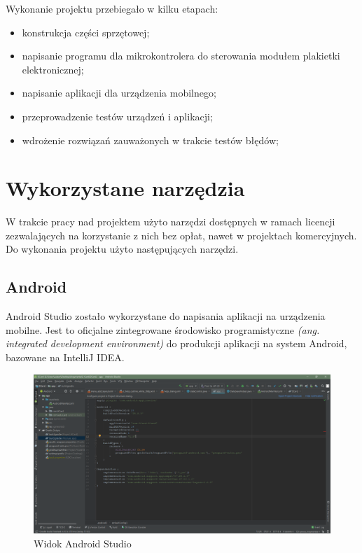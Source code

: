 \documentclass[a4paper,12pt, twoside]{article}
\begin{document}
    	\begin{flushleft}
    	Wykonanie projektu przebiegało w kilku etapach:
    	\begin{itemize}
    	    \item konstrukcja części sprzętowej;
    	    \item napisanie programu dla mikrokontrolera do sterowania modułem plakietki elektronicznej;
    	    \item napisanie aplikacji dla urządzenia mobilnego;
    	    \item przeprowadzenie testów urządzeń i aplikacji;
    	    \item wdrożenie rozwiązań zauważonych w trakcie testów błędów;
    	\end{itemize}
    	\end{flushleft}
 
    	\section{Wykorzystane narzędzia}
    	W trakcie pracy nad projektem użyto narzędzi dostępnych w ramach licencji zezwalających na korzystanie z nich bez opłat, nawet w projektach komercyjnych. Do wykonania projektu użyto następujących narzędzi.
    	
    	\subsection{Android}
    	Android Studio zostało wykorzystane do napisania aplikacji na urządzenia mobilne. Jest to oficjalne zintegrowane środowisko programistyczne \textit{(ang. integrated development environment)} \cite{ide} do produkcji aplikacji na system Android, bazowane na IntelliJ IDEA.
    	
    	\begin{figure}[H]
    	    \centering
    		\includegraphics[width=1\textwidth]{images/rys4_android.png}
    		\caption{Widok Android Studio}
            \label{fig:androidstudio}
    	\end{figure}
     	
\end{document}
